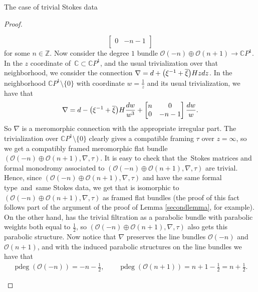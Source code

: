 \documentclass[11pt]{article}
\numberwithin{equation}{section}
\numberwithin{equation}{section}
\newcommand{\CP}{\mathbb{C}P^1}
\begin{document}
\begin{subsubsection}{The case of trivial Stokes data}
\begin{proof}
\begin{itemize}
\begin{equation*}
\begin{bmatrix}
 0 & -n-1\\ \end{bmatrix}
\end{equation*}
for some $n \in \mathbb{Z}$.
Now consider the degree $1$ bundle $\mathcal{O}(-n)\oplus \mathcal{O}(n+1)\to \CP$. In the $z$ coordinate of~${\mathbb{C}\subset \CP}$, and the usual trivialization over that neighborhood, we consider the connection
$
 \nabla= {\rm d} +\bigl(\xi^{-1}+\overline{\xi}\bigr)Hz{\rm d}z$.
In the neighborhood $\CP \setminus\{0\}$ with coordinate $w=\frac{1}{z}$ and its usual trivialization, we have that
\begin{equation*}
 \nabla= {\rm d} -\bigl(\xi^{-1}+\overline{\xi}\bigr)H\frac{{\rm d}w}{w^3} +\begin{bmatrix} n & 0\\
 0 & -n-1 \\ \end{bmatrix}\frac{{\rm d}w}{w}.
\end{equation*}
So $\nabla$ is a meromorphic connection with the appropriate irregular part. The trivialization over $\CP\setminus\{0\}$ clearly gives a compatible framing $\tau$ over $z=\infty$, so we get a compatibly framed meromorphic flat bundle $(\mathcal{O}(-n)\oplus \mathcal{O}(n+1),\nabla,\tau)$.
It is easy to check that the~Stokes matrices and formal monodromy associated to $(\mathcal{O}(-n)\oplus \mathcal{O}(n+1),\nabla,\tau)$ are trivial. Hence, since $(\mathcal{O}(-n)\oplus \mathcal{O}(n+1),\nabla,\tau)$ and  have the same formal type~and~same Stokes data, we get that  is isomorphic to $(\mathcal{O}(-n)\oplus \mathcal{O}({n+1}),\allowbreak\nabla,\tau)$ as framed flat bundles (the proof of this fact follows part of the argument of the proof of Lemma \ref{secondlemma}, for example).
On the other hand,  has the trivial filtration as a parabolic bundle with parabolic weights both equal to $\frac12$, so $(\mathcal{O}(-n)\oplus \mathcal{O}(n+1),\nabla,\tau)$ also gets this parabolic structure. Now notice that $\nabla$ preserves the line bundles $\mathcal{O}(-n)$ and $\mathcal{O}(n+1)$, and with the induced parabolic structures on the line bundles we have that
\begin{gather*}
 \operatorname{pdeg}(\mathcal{O}(-n))=-n-\frac{1}{2},\qquad
 \operatorname{pdeg}(\mathcal{O}(n+1))=n+1-\frac{1}{2}=n+\frac{1}{2}.

\end{gather*}
\end{itemize}
\end{proof}
\end{subsubsection}
\end{document}
